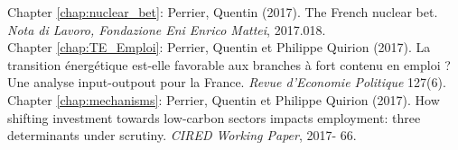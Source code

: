 

Chapter \ref{chap:nuclear_bet}: Perrier, Quentin (2017). The French nuclear bet. {\itshape Nota di Lavoro, Fondazione Eni Enrico Mattei}, 2017.018.\\


Chapter \ref{chap:TE_Emploi}: Perrier, Quentin et Philippe Quirion (2017). La transition énergétique est-elle
favorable aux branches à fort contenu en emploi ? Une analyse input-outpout pour la France. {\itshape Revue d'Economie Politique} 127(6).\\


Chapter \ref{chap:mechanisms}: Perrier, Quentin et Philippe Quirion (2017). How shifting investment towards low-carbon sectors impacts employment: three determinants under scrutiny. {\itshape CIRED Working Paper}, 2017- 66.\\


